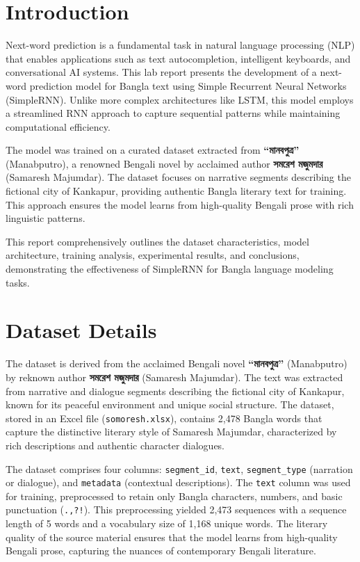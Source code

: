 \documentclass[12pt]{article}
\begin{document}
\section*{Introduction}
Next-word prediction is a fundamental task in natural language processing (NLP) that enables applications such as text autocompletion, intelligent keyboards, and conversational AI systems. This lab report presents the development of a next-word prediction model for Bangla text using Simple Recurrent Neural Networks (SimpleRNN). Unlike more complex architectures like LSTM, this model employs a streamlined RNN approach to capture sequential patterns while maintaining computational efficiency. 

The model was trained on a curated dataset extracted from \textbf{\bengalifont ``মানবপুত্র''} (Manabputro), a renowned Bengali novel by acclaimed author \textbf{\bengalifont সমরেশ মজুমদার} (Samaresh Majumdar). The dataset focuses on narrative segments describing the fictional city of Kankapur, providing authentic Bangla literary text for training. This approach ensures the model learns from high-quality Bengali prose with rich linguistic patterns.

This report comprehensively outlines the dataset characteristics, model architecture, training analysis, experimental results, and conclusions, demonstrating the effectiveness of SimpleRNN for Bangla language modeling tasks.

\section*{Dataset Details}
The dataset is derived from the acclaimed Bengali novel \textbf{\bengalifont ``মানবপুত্র''} (Manabputro) by reknown author \textbf{\bengalifont সমরেশ মজুমদার} (Samaresh Majumdar). The text was extracted from narrative and dialogue segments describing the fictional city of Kankapur, known for its peaceful environment and unique social structure. The dataset, stored in an Excel file (\texttt{somoresh.xlsx}), contains 2,478 Bangla words that capture the distinctive literary style of Samaresh Majumdar, characterized by rich descriptions and authentic character dialogues.

The dataset comprises four columns: \texttt{segment\_id}, \texttt{text}, \texttt{segment\_type} (narration or dialogue), and \texttt{metadata} (contextual descriptions). The \texttt{text} column was used for training, preprocessed to retain only Bangla characters, numbers, and basic punctuation (\texttt{.,?!}). This preprocessing yielded 2,473 sequences with a sequence length of 5 words and a vocabulary size of 1,168 unique words. The literary quality of the source material ensures that the model learns from high-quality Bengali prose, capturing the nuances of contemporary Bengali literature.
\end{document}
